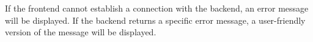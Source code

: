 If the frontend cannot establish a connection with the backend,
an error message will be displayed. \newline
If the backend returns a specific error message, a user-friendly
version of the message will be displayed.
